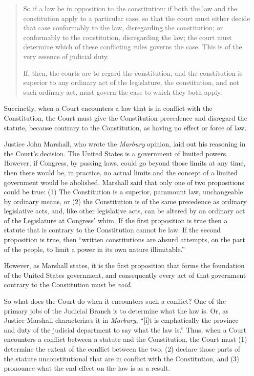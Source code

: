 \begin{quote}
So if a law be in opposition to the constitution; if both the law and the constitution apply to a particular case, so that the court must either decide that case conformably to the law, disregarding the constitution; or conformably to the constitution, disregarding the law; the court must determine which of these conflicting rules governs the case. This is of the very essence of judicial duty.

If, then, the courts are to regard the constitution, and the constitution is superior to any ordinary act of the legislature, the constitution, and not such ordinary act, must govern the case to which they both apply.

\end{quote}

Succinctly, when a Court encounters a law that is in conflict with the Constitution, the Court must give the Constitution precedence and disregard the statute, because contrary to the Constitution, as having no effect or force of law.

Justice John Marshall, who wrote the \textit{Marbury} opinion, laid out his reasoning in the Court's decision.
The United States is a government of limited powers.  However, if Congress, by passing laws, could go beyond those limits at any time, then there would be, in practice, no actual limits and the concept of a limited government would be abolished.  Marshall said that only one of two propositions could be true: (1) The Constitution is a superior, paramount law, unchangeable by ordinary means, or (2) the Constitution is of the same precedence as ordinary legislative acts, and, like other legislative acts, can be altered by an ordinary act of the Legislature at Congress' whim.  If the first proposition is true then a statute that is contrary to the Constitution cannot be law.  If the second proposition is true, then ``written constitutions are absurd attempts, on the part of the people, to limit a power in its own nature illimitable.''

However, as Marshall states, it is the first proposition that forms the foundation of the United States government, and consequently every act of that government contrary to the Constitution must be \textit{void}.  

So what does the Court do when it encounters such a conflict?  One of the primary jobs of the Judicial Branch is to determine what the law is.  Or, as Justice Marshall characterizes it in \textit{Marbury}, ``[i]t is emphatically the province and duty of the judicial department to say what the law is.''  Thus, when a Court encounters a conflict between a statute and the Constitution, the Court must (1) determine the extent of the conflict between the two, (2) declare those parts of the statute unconstitutional that are in conflict with the Constitution, and (3) pronounce what the end effect on the law is as a result.  


